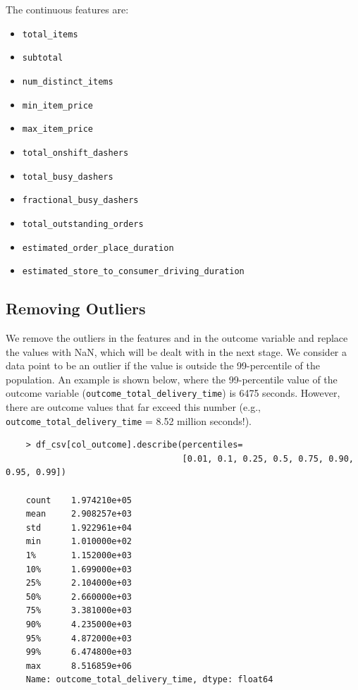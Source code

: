 \documentclass[12pt]{article}
\begin{document}
The continuous features are:
\begin{itemize}
  \item \texttt{total\_items}
  \item \texttt{subtotal}
  \item \texttt{num\_distinct\_items}
  \item \texttt{min\_item\_price}
  \item \texttt{max\_item\_price}
  \item \texttt{total\_onshift\_dashers}
  \item \texttt{total\_busy\_dashers}
  \item \texttt{fractional\_busy\_dashers}
  \item \texttt{total\_outstanding\_orders}
  \item \texttt{estimated\_order\_place\_duration}
  \item \texttt{estimated\_store\_to\_consumer\_driving\_duration}
\end{itemize}


\subsection{Removing Outliers}

We remove the outliers in the features and in the outcome variable and replace the values with NaN, which will be dealt with in the next stage. We consider a data point to be an outlier if the value is outside the 99-percentile of the population. An example is shown below, where the 99-percentile value of the outcome variable (\texttt{outcome\_total\_delivery\_time}) is 6475 seconds. However, there are outcome values that far exceed this number (e.g., \texttt{outcome\_total\_delivery\_time} = 8.52 million seconds!).


\begin{verbatim}
    > df_csv[col_outcome].describe(percentiles=
                                   [0.01, 0.1, 0.25, 0.5, 0.75, 0.90, 0.95, 0.99])

    count    1.974210e+05
    mean     2.908257e+03
    std      1.922961e+04
    min      1.010000e+02
    1%       1.152000e+03
    10%      1.699000e+03
    25%      2.104000e+03
    50%      2.660000e+03
    75%      3.381000e+03
    90%      4.235000e+03
    95%      4.872000e+03
    99%      6.474800e+03
    max      8.516859e+06
    Name: outcome_total_delivery_time, dtype: float64
\end{verbatim}
\end{document}
